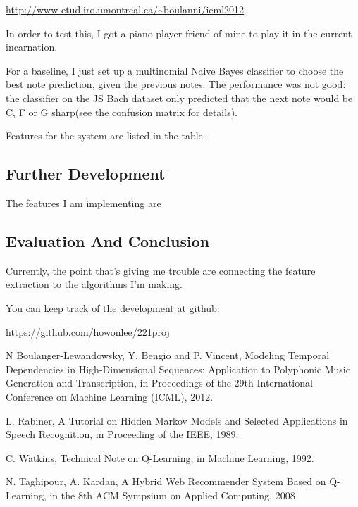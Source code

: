 \documentclass{article}
\begin{document}
\url{http://www-etud.iro.umontreal.ca/~boulanni/icml2012}

In order to test this, I got a piano player friend of mine to play it in the current incarnation.

For a baseline, I just set up a multinomial Naive Bayes classifier to choose the best note prediction, given the previous notes. The performance was not good: the classifier on the JS Bach dataset only predicted that the next note would be C, F or G sharp(see the confusion matrix for details).

Features for the system are listed in the table. %


\subsection*{Further Development}
The features I am implementing are 

\subsection*{Evaluation And Conclusion}

Currently, the point that's giving me trouble are connecting the feature extraction to the algorithms I'm making.

You can keep track of the development at github:

\url{https://github.com/howonlee/221proj}

\begin{thebibliography}{9}%

N Boulanger-Lewandowsky, Y. Bengio and P. Vincent, Modeling Temporal Dependencies in High-Dimensional Sequences: Application to Polyphonic Music Generation and Transcription, in Proceedings of the 29th International Conference on Machine Learning (ICML), 2012.

L. Rabiner, A Tutorial on Hidden Markov Models and Selected Applications in Speech Recognition, in Proceeding of the IEEE, 1989.

C. Watkins, Technical Note on Q-Learning, in Machine Learning, 1992.

N. Taghipour, A. Kardan, A Hybrid Web Recommender System Based on Q-Learning, in the 8th ACM Sympsium on Applied Computing, 2008

\end{thebibliography}
\end{document}
